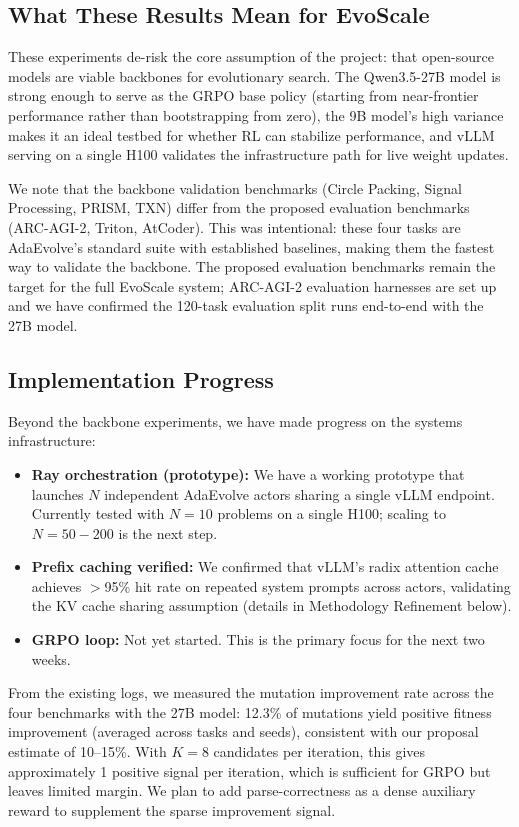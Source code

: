 \documentclass{article}
\begin{document}
\subsection*{What These Results Mean for EvoScale}

These experiments de-risk the core assumption of the project: that open-source models are viable backbones for evolutionary search. The Qwen3.5-27B model is strong enough to serve as the GRPO base policy (starting from near-frontier performance rather than bootstrapping from zero), the 9B model's high variance makes it an ideal testbed for whether RL can stabilize performance, and vLLM serving on a single H100 validates the infrastructure path for live weight updates.

We note that the backbone validation benchmarks (Circle Packing, Signal Processing, PRISM, TXN) differ from the proposed evaluation benchmarks (ARC-AGI-2, Triton, AtCoder). This was intentional: these four tasks are AdaEvolve's standard suite with established baselines, making them the fastest way to validate the backbone. The proposed evaluation benchmarks remain the target for the full EvoScale system; ARC-AGI-2 evaluation harnesses are set up and we have confirmed the 120-task evaluation split runs end-to-end with the 27B model.

\subsection*{Implementation Progress}

Beyond the backbone experiments, we have made progress on the systems infrastructure:
\begin{itemize}
    \item \textbf{Ray orchestration (prototype):} We have a working prototype that launches $N$ independent AdaEvolve actors sharing a single vLLM endpoint. Currently tested with $N=10$ problems on a single H100; scaling to $N=50{-}200$ is the next step.
    \item \textbf{Prefix caching verified:} We confirmed that vLLM's radix attention cache achieves $>$95\% hit rate on repeated system prompts across actors, validating the KV cache sharing assumption (details in Methodology Refinement below).
    \item \textbf{GRPO loop:} Not yet started. This is the primary focus for the next two weeks.
\end{itemize}

From the existing logs, we measured the mutation improvement rate across the four benchmarks with the 27B model: 12.3\% of mutations yield positive fitness improvement (averaged across tasks and seeds), consistent with our proposal estimate of 10--15\%. With $K=8$ candidates per iteration, this gives approximately 1 positive signal per iteration, which is sufficient for GRPO but leaves limited margin. We plan to add parse-correctness as a dense auxiliary reward to supplement the sparse improvement signal.
\end{document}
